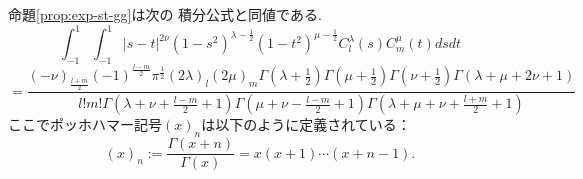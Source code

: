 \documentclass[pdf,notes]{beamer}
\newenvironment{taggedprop}[1]
 {\renewcommand\thetaggedpropx{#1}\taggedpropx}
  {\endtaggedpropx}
\begin{document}
\begin{frame}
	命題\ref{prop:exp-st-gg}は次の
	積分公式と同値である.
	\begin{taggedprop}{$\;1'$}
		\label{prop:int-st-gg}
		\begin{equation*}
			\int_{- 1}^1 \int_{- 1}^1 | s - t |^{2 \nu} (1 - s^2)^{\lambda - \frac{1}{2}}
			(1 - t^2)^{\mu - \frac{1}{2}} C_l^{\lambda} (s) C_m^{\mu} (t) d s d t
		\end{equation*}
		{\scriptsize
		\begin{equation}
			=\frac{(- \nu)_{\frac{l + m}{2}} (- 1)^{\frac{l - m}{2}} \pi^{\frac{1}{2}} (2
			\lambda)_l (2 \mu)_m \Gamma \left( \lambda + \frac{1}{2} \right) \Gamma \left(
			\mu + \frac{1}{2} \right) \Gamma \left( \nu + \frac{1}{2} \right) \Gamma
		(\lambda + \mu + 2 \nu + 1)}{l!m! \Gamma \left( \lambda + \nu + \frac{l -
		m}{2} + 1 \right) \Gamma \left( \mu + \nu - \frac{l - m}{2} + 1 \right) \Gamma
		\left( \lambda + \mu + \nu + \frac{l + m}{2} + 1 \right)}
			\label{eqn:int-st-gg}
			\tag{1$'$}
		\end{equation}
		}
	\end{taggedprop}
	ここでポッホハマー記号$(x)_n$は以下のように定義されている：\begin{equation*}
		(x)_n:=\frac{\Gamma(x+n)}{\Gamma(x)}=x(x+1)\cdots(x+n-1).
	\end{equation*}
\end{frame}
\end{document}
